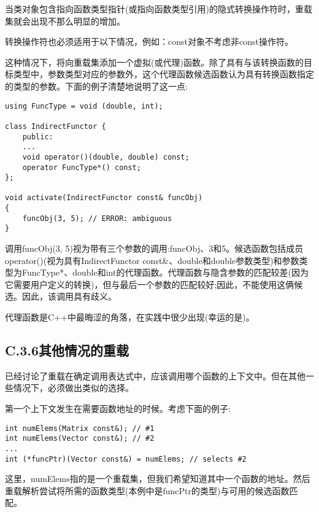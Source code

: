当类对象包含指向函数类型指针(或指向函数类型引用)的隐式转换操作符时，重载集就会出现不那么明显的增加。

\begin{tcolorbox}[colback=webgreen!5!white,colframe=webgreen!75!black]
\hspace*{0.75cm}转换操作符也必须适用于以下情况，例如：const对象不考虑非const操作符。
\end{tcolorbox}

这种情况下，将向重载集添加一个虚拟(或代理)函数。除了具有与该转换函数的目标类型中，参数类型对应的参数外，这个代理函数候选函数认为具有转换函数指定的类型的参数。下面的例子清楚地说明了这一点:

\begin{lstlisting}[style=styleCXX]
using FuncType = void (double, int);

class IndirectFunctor {
	public:
	...
	void operator()(double, double) const;
	operator FuncType*() const;
};

void activate(IndirectFunctor const& funcObj)
{
	funcObj(3, 5); // ERROR: ambiguous
}
\end{lstlisting}

调用funcObj(3, 5)视为带有三个参数的调用:funcObj、3和5。候选函数包括成员operator()(视为具有IndirectFunctor const\&、double和double参数类型)和参数类型为FuncType*、double和int的代理函数。代理函数与隐含参数的匹配较差(因为它需要用户定义的转换)，但与最后一个参数的匹配较好;因此，不能使用这俩候选。因此，该调用具有歧义。

代理函数是C++中最晦涩的角落，在实践中很少出现(幸运的是)。

\subsection{C.3.6\hspace{0.2cm}其他情况的重载}

已经讨论了重载在确定调用表达式中，应该调用哪个函数的上下文中。但在其他一些情况下，必须做出类似的选择。

第一个上下文发生在需要函数地址的时候。考虑下面的例子:

\begin{lstlisting}[style=styleCXX]
int numElems(Matrix const&); // #1
int numElems(Vector const&); // #2
...
int (*funcPtr)(Vector const&) = numElems; // selects #2
\end{lstlisting}

这里，numElems指的是一个重载集，但我们希望知道其中一个函数的地址。然后重载解析尝试将所需的函数类型(本例中是funcPtr的类型)与可用的候选函数匹配。


